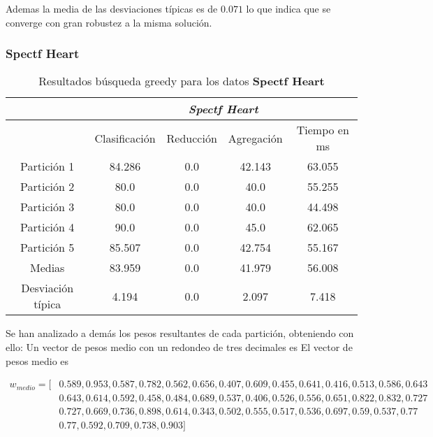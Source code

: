 Ademas la media de las desviaciones típicas es de $0.071$ lo que indica que se converge con gran robustez a la misma solución.



\subsubsection{Spectf Heart} 

\begin{table}[H]
  \centering
  \begin{tabular}{|c|c|c|c|c|}
    \hline
    & \multicolumn{4}{|c|}{\textit{Spectf Heart}}  \\
    \hline
    &	Clasificación &		Reducción	
    &	Agregación	&	Tiempo en ms \\
    \hline
    Partición 1	&    84.286  &  0.0  &  42.143  &  63.055    \\
    Partición 2 &	  80.0  &  0.0  &  40.0  &  55.255    \\
    Partición 3 &       80.0  &  0.0  &  40.0  &  44.498     \\
    Partición 4	&      90.0  &  0.0  &  45.0  &  62.065    \\
    Partición 5	&     85.507  &  0.0  &  42.754  &  55.167    \\
    \hline
    Medias 	 &    83.959  &  0.0  &  41.979  &  56.008   \\
    \hline
    Desviación típica &	   4.194  &  0.0  &  2.097  &  7.418    \\ 
    \hline  
  \end{tabular}
  \caption{Resultados búsqueda greedy para los datos \textbf{Spectf Heart}}
  \label{table:greedy_Spectf Heart}
\end{table}

Se han analizado a demás los pesos resultantes de cada partición, obteniendo con ello: 
Un vector de pesos medio con un redondeo de tres decimales es 
El vector de pesos medio es 

\begin{align*}
w_{medio} = [ 
    &   0.589, 0.953, 0.587, 0.782, 0.562, 0.656, 0.407, 0.609, 0.455, 0.641, 0.416, 0.513, 0.586, 0.643  \\
    &  0.643, 0.614, 0.592, 0.458, 0.484, 0.689, 0.537, 0.406, 0.526, 0.556, 0.651, 0.822, 0.832, 0.727  \\
    &  0.727, 0.669, 0.736, 0.898, 0.614, 0.343, 0.502, 0.555, 0.517, 0.536, 0.697, 0.59, 0.537, 0.77  \\
    &  0.77, 0.592, 0.709, 0.738, 0.903]
\end{align*}


